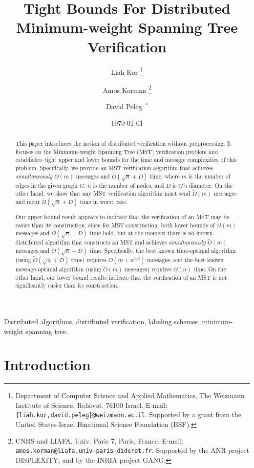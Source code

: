 \documentclass[11pt,letter]{article}
\title{{\bf\Large Tight Bounds For Distributed Minimum-weight Spanning Tree
Verification}}
\date{\today}
\author{
Liah Kor
\thanks{Department of Computer Science and Applied Mathematics, The Weizmann
Institute of Science, Rehovot, 76100 Israel. 
E-mail: {\tt \{liah.kor,david.peleg\}@weizmann.ac.il}.
Supported by a grant from the United States-Israel Binational Science 
Foundation (BSF).}
\and
Amos Korman
\thanks{CNRS and LIAFA, Univ. Paris 7, Paris, France. 
E-mail: {\tt amos.korman@liafa.univ-paris-diderot.fr}. 
Supported by the ANR project DISPLEXITY, 
and by the INRIA project GANG.}
\and 
David Peleg~$^*$
}
\date{}
\def\tO{{\tilde{O}}}
\begin{document}
\maketitle

\begin{abstract}
This paper introduces the notion of distributed verification without 
preprocessing. It focuses on the Minimum-weight Spanning Tree (MST) 
verification problem and establishes tight upper and lower bounds for 
the time and message complexities of this problem. Specifically, we
provide an MST verification algorithm that achieves {\em simultaneously} 
$\tilde{O}(m)$ messages and $\tilde{O}(\sqrt{n} + D)$ time, where $m$ is 
the number of edges in the given graph $G$, $n$ is the number of nodes, 
and $D$ is $G$'s diameter. On the other hand, we show that any MST 
verification algorithm must send $\tilde{\Omega}(m)$ messages and incur 
$\tilde{\Omega}(\sqrt{n} + D)$ time in worst case.

Our upper bound result appears to indicate that the verification of an MST may be easier than 
its construction, since for MST construction, both lower bounds of
$\tilde{\Omega}(m)$ messages and $\tilde{\Omega}(\sqrt{n} + D)$ time hold, but at the moment 
there is no known distributed algorithm that constructs an MST and  achieves 
{\em simultaneously} $\tilde{O}(m)$ messages and $\tilde{O}(\sqrt{n} + D)$ time.
Specifically, the best known time-optimal algorithm (using $\tO(\sqrt{n} + D)$ 
time) requires $O(m+n^{3/2})$ messages, and the best known message-optimal 
algorithm (using $\tO(m)$ messages) requires $O(n)$ time.
On the other hand, our lower bound results indicate that the verification of an MST is not significantly easier than its construction.
\end{abstract}



 Distributed algorithms, distributed verification, labeling schemes, minimum-weight spanning tree.

\section {Introduction}
\end{document}
